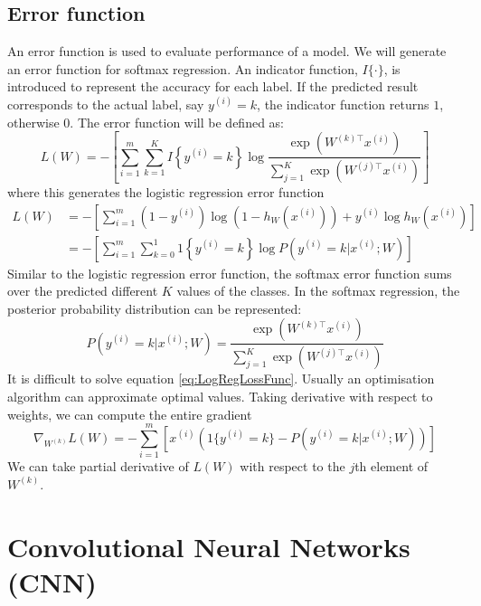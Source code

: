 \subsection{Error function}
An error function is used to evaluate performance of a model. We will generate an error function for softmax regression. An indicator function, $I\{\cdot\}$, is introduced to represent the accuracy for each label. If the predicted result corresponds to the actual label, say $y^{(i)} = k$, the indicator function returns $1$, otherwise $0$. The error function will be defined as:
\begin{equation}\label{eq:LogLossFunc}
L(W) = - \left[ \sum_{i=1}^{m} \sum_{k=1}^{K}  I\left\{y^{(i)} = k\right\} \log \frac{\exp(W^{(k)\top} x^{(i)})}{\sum_{j=1}^K \exp(W^{(j)\top} x^{(i)})}\right]
\end{equation}
where this generates the logistic regression error function
\begin{align}\label{eq:LogRegLossFunc}
L(W) &= - \left[ \sum_{i=1}^m   (1-y^{(i)}) \log (1-h_W(x^{(i)})) + y^{(i)} \log h_W(x^{(i)}) \right] \\
&= - \left[ \sum_{i=1}^{m} \sum_{k=0}^{1} 1\left\{y^{(i)} = k\right\} \log P(y^{(i)} = k | x^{(i)} ; W) \right]
\end{align}
Similar to the logistic regression error function, the softmax error function sums over the predicted different $K$ values of the classes. In the softmax regression, the posterior probability distribution can be represented:
\begin{equation}\label{eq:PostProbDis}
P(y^{(i)} = k | x^{(i)} ; W) = \frac{\exp(W^{(k)\top} x^{(i)})}{\sum_{j=1}^K \exp(W^{(j)\top} x^{(i)}) }
\end{equation}
It is difficult to solve equation \ref{eq:LogRegLossFunc}. Usually an optimisation algorithm can approximate optimal values. Taking derivative with respect to weights, we can compute the entire gradient 
\begin{equation}\label{eq:PartDer}
\nabla_{W^{(k)}} L(W) = - \sum_{i=1}^{m}{ \left[ x^{(i)} \left( 1\{ y^{(i)} = k\}  - P(y^{(i)} = k | x^{(i)}; W) \right) \right]  }
\end{equation}
We can take partial derivative of $L(W)$ with respect to the $j$th element of $W^{(k)}$.

\section{Convolutional Neural Networks (CNN)}

